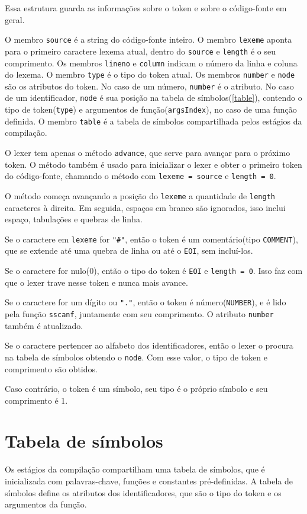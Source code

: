 \documentclass[10pt,a4paper]{article}
\begin{document}
Essa estrutura guarda as informações sobre o token e sobre o código-fonte em geral.

O membro \texttt{source} é a string do código-fonte inteiro.
O membro \texttt{lexeme} aponta para o primeiro caractere lexema atual,
dentro do \texttt{source} e \texttt{length} é o seu comprimento.
Os membros \texttt{lineno} e \texttt{column} indicam o número da linha e coluna do lexema.
O membro \texttt{type} é o tipo do token atual.
Os membros \texttt{number} e \texttt{node} são os atributos do token.
No caso de um número, \texttt{number} é o atributo.
No caso de um identificador, \texttt{node} é sua posição na tabela de símbolos(\ref{table}), 
contendo o tipo de token(\texttt{type}) e argumentos de função(\texttt{argsIndex}), no caso de uma função definida.
O membro \texttt{table} é a tabela de símbolos compartilhada pelos estágios da compilação.

O lexer tem apenas o método \texttt{advance}, que serve para avançar para o próximo token.
O método também é usado para inicializar o lexer e obter o primeiro token do código-fonte,
chamando o método com \texttt{lexeme = source} e \texttt{length = 0}.

O método começa avançando a posição do \texttt{lexeme} a quantidade de \texttt{length} caracteres à direita.
Em seguida, espaços em branco são ignorados, isso inclui espaço, tabulações e quebras de linha.

Se o caractere em \texttt{lexeme} for \texttt{"\#"}, então o token é um comentário(tipo \texttt{COMMENT}),
que se extende até uma quebra de linha ou até o \texttt{EOI}, sem incluí-los.

Se o caractere for nulo(0), então o tipo do token é \texttt{EOI} e \texttt{length = 0}.
Isso faz com que o lexer trave nesse token e nunca mais avance.

Se o caractere for um dígito ou \texttt{"."}, então o token é número(\texttt{NUMBER}),
e é lido pela função \texttt{sscanf}, juntamente com seu comprimento. O atributo \texttt{number} também é atualizado.

Se o caractere pertencer ao alfabeto dos identificadores,
então o lexer o procura na tabela de símbolos obtendo o \texttt{node}.
Com esse valor, o tipo de token e comprimento são obtidos.

Caso contrário, o token é um símbolo, seu tipo é o próprio símbolo e seu comprimento é 1.
\newpage
\section{Tabela de símbolos}
Os estágios da compilação compartilham uma tabela de símbolos, que é inicializada com palavras-chave,
funções e constantes pré-definidas.
A tabela de símbolos define os atributos dos identificadores,
que são o tipo do token e os argumentos da função. 
\end{document}
